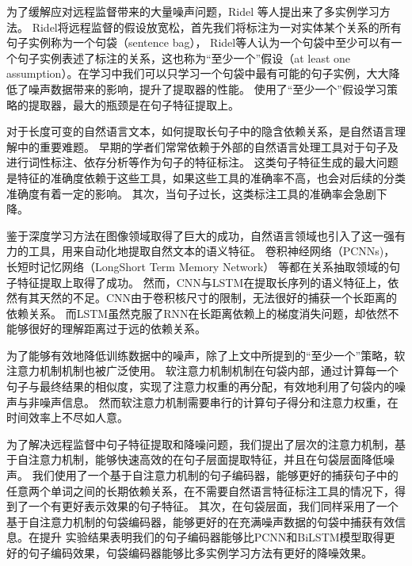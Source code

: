 \documentclass[UTF8]{csoarticle}
\begin{document}
为了缓解应对远程监督带来的大量噪声问题，Ridel\cite{bib1} 等人提出来了多实例学习方法。
Ridel将远程监督的假设放宽松，首先我们将标注为一对实体某个关系的所有句子实例称为一个句袋（sentence bag），
Ridel等人认为一个句袋中至少可以有一个句子实例表述了标注的关系，这也称为“至少一个”假设（at least one assumption）。在学习中我们可以只学习一个句袋中最有可能的句子实例，大大降低了噪声数据带来的影响，提升了提取器的性能。
使用了“至少一个”假设学习策略的提取器，最大的瓶颈是在句子特征提取上。

对于长度可变的自然语言文本，如何提取长句子中的隐含依赖关系，是自然语言理解中的重要难题。
早期的学者们常常依赖于外部的自然语言处理工具对于句子及进行词性标注、依存分析等作为句子的特征标注。
这类句子特征生成的最大问题是特征的准确度依赖于这些工具，如果这些工具的准确率不高，也会对后续的分类准确度有着一定的影响。
其次，当句子过长，这类标注工具的准确率会急剧下降。


鉴于深度学习方法在图像领域取得了巨大的成功，自然语言领域也引入了这一强有力的工具，用来自动化地提取自然文本的语义特征。
卷积神经网络（PCNNs)\cite{bib11}，长短时记忆网络（LongShort Term Memory Network）\cite{bib10} 等都在关系抽取领域的句子特征提取上取得了成功。
然而，CNN与LSTM在提取长序列的语义特征上，依然有其天然的不足。CNN由于卷积核尺寸的限制，无法很好的捕获一个长距离的依赖关系。
而LSTM虽然克服了RNN在长距离依赖上的梯度消失问题，却依然不能够很好的理解距离过于远的依赖关系。

为了能够有效地降低训练数据中的噪声，除了上文中所提到的“至少一个”策略，软注意力机制机制也被广泛使用。
软注意力机制机制在句袋内部，通过计算每一个句子与最终结果的相似度，实现了注意力权重的再分配，有效地利用了句袋内的噪声与非噪声信息。
然而软注意力机制需要串行的计算句子得分和注意力权重，在时间效率上不尽如人意。

为了解决远程监督中句子特征提取和降噪问题，我们提出了层次的注意力机制，基于自注意力机制，能够快速高效的在句子层面提取特征，并且在句袋层面降低噪声。
我们使用了一个基于自注意力机制的句子编码器，能够更好的捕获句子中的任意两个单词之间的长期依赖关系，在不需要自然语言特征标注工具的情况下，得到了一个有更好表示效果的句子特征。
其次，在句袋层面，我们同样采用了一个基于自注意力机制的句袋编码器，能够更好的在充满噪声数据的句袋中捕获有效信息。在提升
实验结果表明我们的句子编码器能够比PCNN和BiLSTM模型取得更好的句子编码效果，句袋编码器能够比多实例学习方法有更好的降噪效果。
\end{document}
